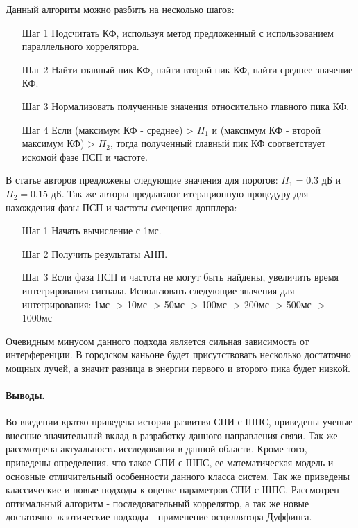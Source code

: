 Данный алгоритм можно разбить на несколько шагов:
\begin{itemize}
\item[Шаг 1] Подсчитать КФ, используя метод предложенный с использованием параллельного коррелятора. 
\item[Шаг 2] Найти главный пик КФ, найти второй пик КФ, найти среднее значение КФ.
\item[Шаг 3] Нормализовать полученные значения относительно главного пика КФ.
\item[Шаг 4] Если (максимум КФ - среднее) > ${\Pi_1}$ и (максимум КФ - 
	второй максимум КФ) > ${\Pi_2}$, тогда полученный главный пик КФ соответствует
	искомой фазе ПСП и частоте.
\end{itemize}

В статье авторов \cite{2max_ieee} предложены следующие значения для порогов:
${\Pi_1} = 0.3$ дБ и  ${\Pi_2} = 0.15$ дБ. Так же авторы предлагают итерационную процедуру для нахождения
фазы ПСП и частоты смещения допплера:
\begin{itemize}
\item[Шаг 1] Начать вычисление с 1мс.
\item[Шаг 2] Получить результаты АНП.
\item[Шаг 3] Если фаза ПСП и частота не могут быть найдены, увеличить время интегрирования сигнала.
	Использовать следующие значения для интегрирования: 1мс -> 10мс -> 50мс -> 100мс -> 200мс ->
	500мс -> 1000мс
\end{itemize}

Очевидным минусом данного подхода является сильная зависимость от интерференции. В городском каньоне будет присутствовать
несколько достаточно мощных лучей, а значит разница в энергии первого и второго пика будет низкой.

\paragraph{Выводы.}

Во введении кратко приведена история развития СПИ с ШПС, приведены ученые внесшие значительный вклад в разработку данного направления связи. Так же рассмотрена
актуальность исследования в данной области. Кроме того, приведены определения, что такое СПИ с ШПС, ее математическая модель и основные отличительный особенности данного класса систем.
Так же приведены классические и новые подходы к оценке параметров СПИ с ШПС. Рассмотрен оптимальный алгоритм - последовательный коррелятор,
а так же новые достаточно экзотические подходы - применение осциллятора Дуффинга. 

\newpage
